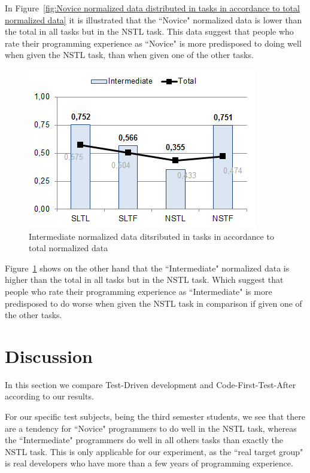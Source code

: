 \documentclass{sig-alternate-05-2015}
\begin{document}
In Figure~\ref{fig:Novice normalized data distributed in tasks in accordance to total normalized data} it is illustrated that the ``Novice" normalized data is lower than the total in all tasks but in the NSTL task. This data suggest that people who rate their programming experience as ``Novice" is more predisposed to doing well when given the NSTL task, than when given one of the other tasks.

\begin{figure}[!ht]
	\centering
	\includegraphics[width=1\linewidth]{img12}
	\caption{Intermediate normalized data ditsributed in tasks in accordance to total normalized data}
	\label{fig:Intermediate normalized data ditsributed in tasks in accordance to total normalized data}
\end{figure}

Figure~\ref{fig:Intermediate normalized data ditsributed in tasks in accordance to total normalized data} shows on the other hand that the ``Intermediate" normalized data is higher than the total in all tasks but in the NSTL task. Which suggest that people who rate their programming experience as ``Intermediate" is more predisposed to do worse when given the NSTL task in comparison if given one of the other tasks.


\section{Discussion}
\label{sec:Discussion}
In this section we compare Test-Driven development and Code-First-Test-After according to our results.

For our specific test subjects, being the third semester students, we see that there are a tendency for ``Novice" programmers to do well in the NSTL task, whereas the ``Intermediate" programmers do well in all others tasks than exactly the NSTL task. This is only applicable for our experiment, as the ``real target group" is real developers who have more than a few years of programming experience.
\end{document}
